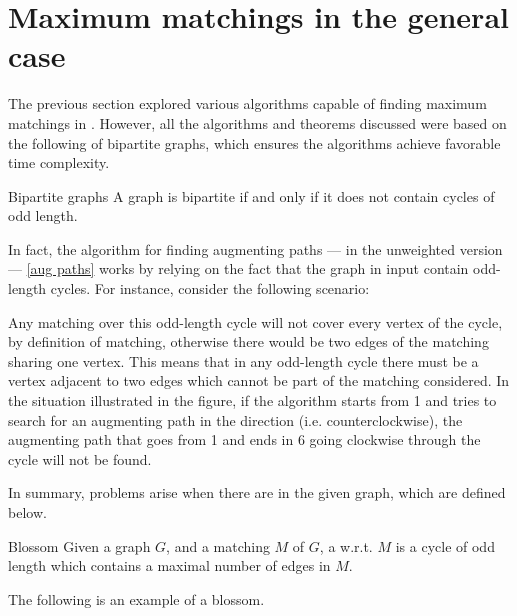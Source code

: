 \documentclass[a4paper, 12pt]{report}
\begin{document}
    \section{Maximum matchings in the general case}

    The previous section explored various algorithms capable of finding maximum matchings in . However, all the algorithms and theorems discussed were based on the following  of bipartite graphs, which ensures the algorithms achieve favorable time complexity.

    \begin{framedthm}{Bipartite graphs}
        A graph is bipartite if and only if it does not contain cycles of odd length.
    \end{framedthm}

    In fact, the algorithm for finding augmenting paths --- in the unweighted version --- \cref{aug paths} works by relying on the fact that the graph in input  contain odd-length cycles. For instance, consider the following scenario:


    Any matching over this odd-length cycle will not cover every vertex of the cycle, by definition of matching, otherwise there would be two edges of the matching sharing one vertex. This means that in any odd-length cycle there must be a vertex adjacent to two edges which cannot be part of the matching considered. In the situation illustrated in the figure, if the algorithm starts from 1 and tries to search for an augmenting path in the  direction (i.e. counterclockwise), the augmenting path that goes from 1 and ends in 6 going clockwise through the cycle will not be found.

    In summary, problems arise when there are  in the given graph, which are defined below.

    \begin{frameddefn}[label={blossom}]{Blossom}
        Given a graph $G$, and a matching $M$ of $G$, a  w.r.t. $M$ is a cycle of odd length which contains a maximal number of edges in $M$.
    \end{frameddefn}

    \begin{example}[Blossoms]
        The following is an example of a blossom.

    \end{example}
\end{document}
